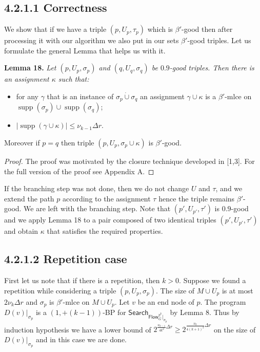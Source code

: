 \documentclass[10pt,a4paper]{article}
\newcommand{\Search}{\mathsf{Search}}
\newcommand{\Flow}{\mathsf{Flow}}
\newcommand{\supp}{\operatorname{supp}}
\newcommand{\joint}{\mathbin{\dot\cup}}
\newenvironment{result}[1]{\par\medskip\noindent\textbf{#1.}\itshape}{\par\medskip}
\begin{document}
\subsection*{4.2.1.1 Correctness}
We show that if we have a triple $(p,U_p,\tau_p)$ which is $\beta'$-good then after processing it with our algorithm we also put in our sets $\beta'$-good triples. Let us formulate the general Lemma that helps us with it.
\begin{result}{Lemma 18}
Let $(p,U_p,\sigma_p)$ and $(q,U_q,\sigma_q)$ be $0.9$-good triples. Then there is an assignment $\kappa$ such that:
\begin{itemize}\item for any $\gamma$ that is an instance of $\sigma_p\joint\sigma_q$ an assignment $\gamma\cup\kappa$ is a $\beta'$-mlce on $\supp(\sigma_p)\cup\supp(\sigma_q)$;
\item $|\supp(\gamma\cup\kappa)|\le\nu_{k-1}\Delta r$.\end{itemize}
Moreover if $p=q$ then triple $(p,U_p,\sigma_p\cup\kappa)$ is $\beta'$-good.
\end{result}
\begin{proof}
The proof was motivated by the closure technique developed in [1,3]. For the full version of the proof see Appendix A.
\end{proof}
If the branching step was not done, then we do not change $U$ and $\tau$, and we extend the path $p$ according to the assignment $\tau$ hence the triple remains $\beta'$-good. We are left with the branching step. Note that $(p',U_{p'},\tau')$ is $0.9$-good and we apply Lemma 18 to a pair composed of two identical triples $(p',U_{p'},\tau')$ and obtain $\kappa$ that satisfies the required properties.
\subsection*{4.2.1.2 Repetition case}
First let us note that if there is a repetition, then $k>0$. Suppose we found a repetition while considering a triple $(p,U_p,\sigma_p)$. The size of $M\cup U_p$ is at most $2\nu_k\Delta r$ and $\sigma_p$ is $\beta'$-mlce on $M\cup U_p$. Let $v$ be an end node of $p$. The program $D(v)|_{\sigma_p}$ is a $(1,+(k-1))$-BP for $\Search_{\Flow_G^{\eta^k}|_{\sigma_p}}$ by Lemma 8. Thus by induction hypothesis we have a lower bound of $2^{\frac{\nu_{k-1}}{4k^2}\Delta r}\ge2^{\frac{\nu_k}{4(k+1)^2}\Delta r}$ on the size of $D(v)|_{\sigma_p}$ and in this case we are done.
\end{document}
